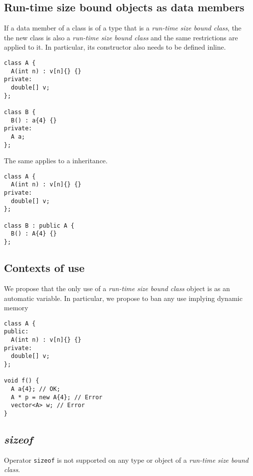 \subsection{Run-time size bound objects as data members}

If a data member of a class is of a type that is a \emph{run-time size bound class}, the the new 
class is also a \emph{run-time size bound class} and the same restrictions are
applied to it. In particular, its constructor also needs to be defined inline.

\begin{lstlisting}
class A {
  A(int n) : v[n]{} {}
private:
  double[] v;
};

class B {
  B() : a{4} {}
private:
  A a;
};
\end{lstlisting}

The same applies to a inheritance.

\begin{lstlisting}
class A {
  A(int n) : v[n]{} {}
private:
  double[] v;
};

class B : public A {
  B() : A{4} {}
};
\end{lstlisting}

\subsection{Contexts of use}

We propose that the only use of a \emph{run-time size bound class} object is as
an automatic variable. In particular, we propose to ban any use implying dynamic
memory

\begin{lstlisting}
class A {
public:
  A(int n) : v[n]{} {}
private:
  double[] v;
};

void f() {
  A a{4}; // OK;
  A * p = new A{4}; // Error
  vector<A> w; // Error
}
\end{lstlisting}

\subsection{\emph{sizeof}}

Operator \verb+sizeof+ is not supported on any type or object of a \emph{run-time size bound class}.
